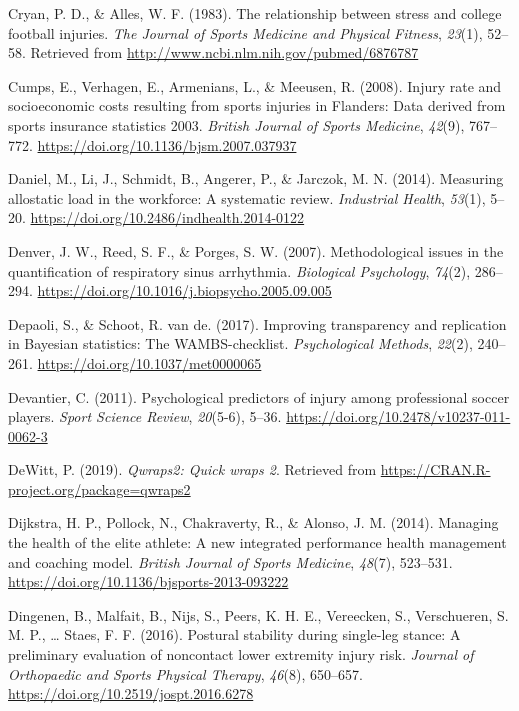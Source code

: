 \documentclass[man,floatsintext]{apa6}
\begin{document}
\leavevmode\hypertarget{ref-Cryan1983}{}%
Cryan, P. D., \& Alles, W. F. (1983). The relationship between stress and college football injuries. \emph{The Journal of Sports Medicine and Physical Fitness}, \emph{23}(1), 52--58. Retrieved from \url{http://www.ncbi.nlm.nih.gov/pubmed/6876787}

\leavevmode\hypertarget{ref-Cumps2008a}{}%
Cumps, E., Verhagen, E., Armenians, L., \& Meeusen, R. (2008). Injury rate and socioeconomic costs resulting from sports injuries in Flanders: Data derived from sports insurance statistics 2003. \emph{British Journal of Sports Medicine}, \emph{42}(9), 767--772. \url{https://doi.org/10.1136/bjsm.2007.037937}

\leavevmode\hypertarget{ref-Mauss2014}{}%
Daniel, M., Li, J., Schmidt, B., Angerer, P., \& Jarczok, M. N. (2014). Measuring allostatic load in the workforce: A systematic review. \emph{Industrial Health}, \emph{53}(1), 5--20. \url{https://doi.org/10.2486/indhealth.2014-0122}

\leavevmode\hypertarget{ref-Denver2007}{}%
Denver, J. W., Reed, S. F., \& Porges, S. W. (2007). Methodological issues in the quantification of respiratory sinus arrhythmia. \emph{Biological Psychology}, \emph{74}(2), 286--294. \url{https://doi.org/10.1016/j.biopsycho.2005.09.005}

\leavevmode\hypertarget{ref-Depaoli2017}{}%
Depaoli, S., \& Schoot, R. van de. (2017). Improving transparency and replication in Bayesian statistics: The WAMBS-checklist. \emph{Psychological Methods}, \emph{22}(2), 240--261. \url{https://doi.org/10.1037/met0000065}

\leavevmode\hypertarget{ref-Devantier2011}{}%
Devantier, C. (2011). Psychological predictors of injury among professional soccer players. \emph{Sport Science Review}, \emph{20}(5-6), 5--36. \url{https://doi.org/10.2478/v10237-011-0062-3}

\leavevmode\hypertarget{ref-R-qwraps2}{}%
DeWitt, P. (2019). \emph{Qwraps2: Quick wraps 2}. Retrieved from \url{https://CRAN.R-project.org/package=qwraps2}

\leavevmode\hypertarget{ref-Dijkstra2014}{}%
Dijkstra, H. P., Pollock, N., Chakraverty, R., \& Alonso, J. M. (2014). Managing the health of the elite athlete: A new integrated performance health management and coaching model. \emph{British Journal of Sports Medicine}, \emph{48}(7), 523--531. \url{https://doi.org/10.1136/bjsports-2013-093222}

\leavevmode\hypertarget{ref-Dingenen2016}{}%
Dingenen, B., Malfait, B., Nijs, S., Peers, K. H. E., Vereecken, S., Verschueren, S. M. P., \ldots{} Staes, F. F. (2016). Postural stability during single-leg stance: A preliminary evaluation of noncontact lower extremity injury risk. \emph{Journal of Orthopaedic and Sports Physical Therapy}, \emph{46}(8), 650--657. \url{https://doi.org/10.2519/jospt.2016.6278}
\end{document}
